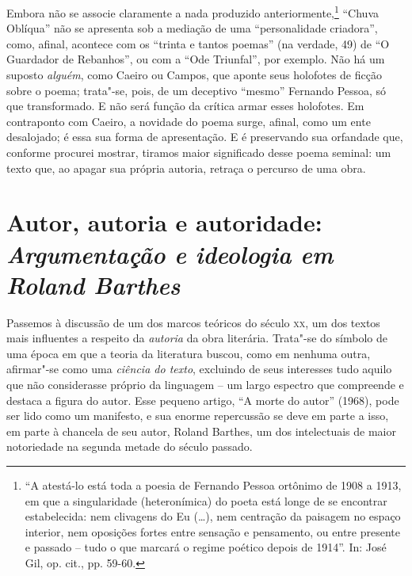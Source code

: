 Embora não se associe claramente a nada produzido
anteriormente,\footnote{``A atestá-lo está toda a poesia de Fernando
  Pessoa ortônimo de 1908 a 1913, em que a singularidade (heteronímica)
  do poeta está longe de se encontrar estabelecida: nem clivagens do Eu
  (\ldots{}), nem centração da paisagem no espaço interior, nem oposições
  fortes entre sensação e pensamento, ou entre presente e passado --
  tudo o que marcará o regime poético depois de 1914''. In: José Gil,
  op. cit., pp. 59-60.} ``Chuva Oblíqua'' não se apresenta sob a
mediação de uma ``personalidade criadora'', como, afinal, acontece com
os ``trinta e tantos poemas'' (na verdade, 49) de ``O Guardador de
Rebanhos'', ou com a ``Ode Triunfal'', por exemplo. Não há um suposto
\emph{alguém}, como Caeiro ou Campos, que aponte seus holofotes de
ficção sobre o poema; trata"-se, pois, de um deceptivo ``mesmo'' Fernando
Pessoa, só que transformado. E não será função da crítica armar esses
holofotes. Em contraponto com Caeiro, a novidade do poema surge, afinal, como um ente desalojado; é
essa sua forma de apresentação. E é preservando sua orfandade que,
conforme procurei mostrar, tiramos maior significado desse poema
seminal: um texto que, ao apagar sua própria autoria, retraça o percurso
de uma obra.

\chapter*{Autor, autoria e autoridade:\\ \emph{\large Argumentação e ideologia em Roland Barthes}}




Passemos à discussão de um dos marcos teóricos do século \textsc{xx}, um
dos textos mais influentes a respeito da \emph{autoria} da obra
literária. Trata"-se do símbolo de uma época em que a teoria da
literatura buscou, como em nenhuma outra, afirmar"-se como uma
\emph{ciência do texto}, excluindo de seus interesses tudo aquilo que
não considerasse próprio da linguagem -- um largo espectro que
compreende e destaca a figura do autor. Esse pequeno artigo, ``A morte
do autor'' (1968), pode ser lido como um manifesto, e sua enorme
repercussão se deve em parte a isso, em parte à chancela de seu autor,
Roland Barthes, um dos intelectuais de maior notoriedade na segunda
metade do século passado.

